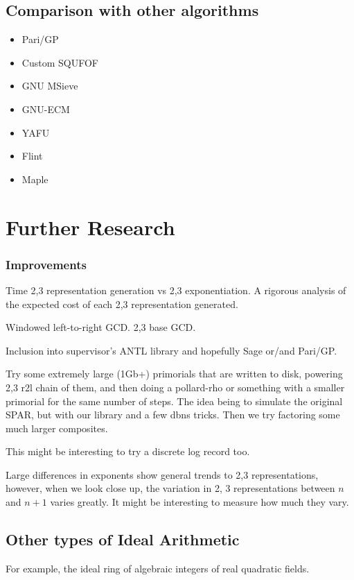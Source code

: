 \documentclass{ucalgthes1}
\theoremstyle{definition}
\begin{document}
\section{Comparison with other algorithms}
\begin{itemize}
\item Pari/GP
\item Custom SQUFOF
\item GNU MSieve
\item GNU-ECM
\item YAFU
\item Flint
\item Maple
\end{itemize}

\chapter{Further Research}

\subsection{Improvements}

Time 2,3 representation generation vs 2,3 exponentiation.
A rigorous analysis of the expected cost of each 2,3 representation generated.

Windowed left-to-right GCD.
2,3 base GCD.

Inclusion into supervisor's ANTL library and hopefully Sage or/and Pari/GP.

Try some extremely large (1Gb+) primorials that are written to disk, powering 2,3 r2l chain of them, and then doing a pollard-rho or something with a smaller primorial for the same number of steps.  The idea being to simulate the original SPAR, but with our library and a few dbns tricks.  Then we try factoring some much larger composites.

This might be interesting to try a discrete log record too.

Large differences in exponents show general trends to 2,3 representations, however, when we look close up, the variation in 2, 3 representations between $n$ and $n+1$ varies greatly.  It might be interesting to measure how much they vary.  


\section{Other types of Ideal Arithmetic}
For example, the ideal ring of algebraic integers of real quadratic fields.
\end{document}
